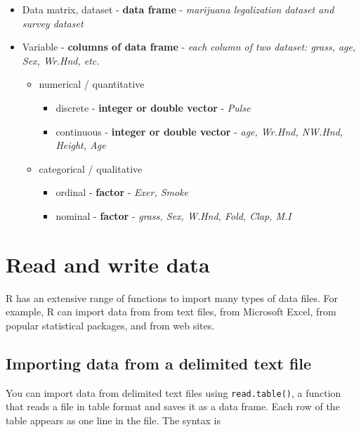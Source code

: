 \documentclass[
]{book}
\providecommand{\tightlist}{%
  \setlength{\itemsep}{0pt}\setlength{\parskip}{0pt}}
\begin{document}
\begin{itemize}
\item
  Data matrix, dataset - \textbf{data frame} - \emph{marijuana legalization
  dataset and survey dataset}
\item
  Variable - \textbf{columns of data frame} - \emph{each column of two dataset:
  grass, age, Sex, Wr.Hnd, etc.}

  \begin{itemize}
  \item
    numerical / quantitative

    \begin{itemize}
    \tightlist
    \item
      discrete - \textbf{integer or double vector} - \emph{Pulse}
    \item
      continuous - \textbf{integer or double vector} - \emph{age, Wr.Hnd,
      NW.Hnd, Height, Age}
    \end{itemize}
  \item
    categorical / qualitative

    \begin{itemize}
    \tightlist
    \item
      ordinal - \textbf{factor} - \emph{Exer, Smoke}
    \item
      nominal - \textbf{factor} - \emph{grass, Sex, W.Hnd, Fold, Clap, M.I}
    \end{itemize}
  \end{itemize}
\end{itemize}

\hypertarget{read-and-write-data}{%
\section{Read and write data}\label{read-and-write-data}}

R has an extensive range of functions to import many types of data files. For example, R can import data from from text files, from Microsoft Excel, from popular statistical packages, and from web sites.

\hypertarget{importing-data-from-a-delimited-text-file}{%
\subsection{Importing data from a delimited text file}\label{importing-data-from-a-delimited-text-file}}

You can import data from delimited text files using \texttt{read.table()}, a function that reads a file in table format and saves it as a data frame. Each row of the table appears as one line in the file. The syntax is
\end{document}

